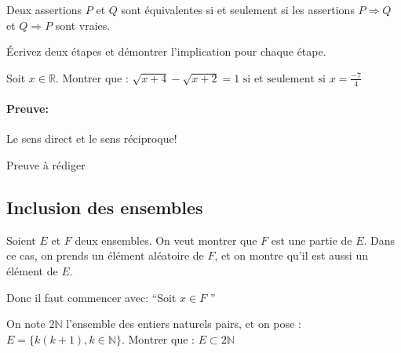 \documentclass{article}
\begin{document}
Deux assertions $P$ et $Q$ sont équivalentes si et seulement si les assertions $P \Rightarrow Q$ et $Q \Rightarrow P$ sont vraies.

\begin{tcolorbox}[colback=green!5!white,colframe=green!75!black,title=Point méthode 4.4]

Écrivez deux étapes et démontrer l'implication pour chaque étape.

\end{tcolorbox}


\begin{tcolorbox}[colback=cyan!5!white,colframe=cyan!75!black,title=Exercice]

Soit \( x \in \mathbb{R} \). Montrer que : $\sqrt{x+4} - \sqrt{x+2} = 1 \text{ si et seulement si } x = \frac{-7}{4}$


\end{tcolorbox}


\paragraph{Preuve:} Le sens direct et le sens réciproque!

\noindent Preuve à rédiger














\subsection{Inclusion des ensembles}

\begin{tcolorbox}[colback=green!5!white,colframe=green!75!black,title=Point méthode 4.5/2.1]

Soient $E$ et $F$ deux ensembles. On veut montrer que $F$ est une partie de $E$. Dans ce cas, on prends un élément aléatoire de $F$, et on montre qu'il est aussi un élément de $E$.

Donc il faut commencer avec: ``Soit $x \in F$ ''

\end{tcolorbox}


\begin{tcolorbox}[colback=cyan!5!white,colframe=cyan!75!black,title=Exercice]

On note \( 2\mathbb{N} \) l’ensemble des entiers naturels pairs, et on pose :$E = \{k(k+1), k \in \mathbb{N}\}$.
Montrer que : $E \subset 2\mathbb{N}$

\end{tcolorbox}
\end{document}
